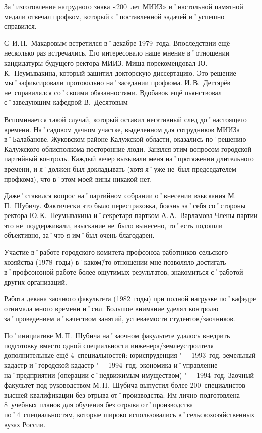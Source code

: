 За˚изготовление нагрудного знака «200~лет МИИЗ» и˚настольной памятной медали отвечал профком, который с˚поставленной задачей и˚успешно справился.

С~И.\,П.~Макаровым встретился в˚декабре 1979~года. Впоследствии ещё несколько раз встречались. Его интересовало наше мнение в˚отношении кандидатуры будущего ректора МИИЗ. Миша порекомендовал Ю.\,К.~Неумывакина, который защитил докторскую диссертацию. Это решение мы˚зафиксировали протокольно на˚заседании профкома. И.\,В.~Дегтярёв не~справилялся со˚своими обязанностями. Вдобавок ещё пьянствовал с˚заведующим кафедрой В.~Десятовым

Вспоминается такой случай, который оставил негативный след до˚настоящего времени. На˚садовом дачном участке, выделенном для сотрудников МИИЗа в˚Балабанове, Жуковском районе Калужской области, оказались по˚решению Калужского облисполкома посторонние люди. Занялся этим вопросом городской партийный контроль. Каждый вечер вызывали меня на˚протяжении длительного времени, и я˚должен был докладывать (хотя я˚уже не~был председателем профкома), что в˚этом моей вины никакой нет.

Даже˚ставился вопрос на˚партийном собрании о˚внесении взыскания М.\,П.~Шубичу. Фактически это было перестраховка, боязнь за˚себя со˚стороны ректора Ю.\,К.~Неумывакина и˚секретаря партком А.\,А.~Варламова Члены партии это не~поддерживали, взыскание не~было вынесено, то˚есть подошли объективно, за˚что я им˚был очень благодарен.

Участие в˚работе городского комитета профсоюза работников сельского хозяйства (1978~годы) в˚каком\=/то отношении мне позволяло достигать в˚профсоюзной работе более ощутимых результатов, знакомиться с˚работой других организаций.

Работа декана заочного факультета (1982~годы) при полной нагрузке по˚кафедре отнимала много времени и˚сил. Большое внимание уделял контролю за˚проведением и˚качеством занятий, успеваемости студентов\-/заочников.

По˚инициативе М.\,П.~Шубича на˚заочном факультете удалось внедрить подготовку вместо одной специальности инженера\-/землеустроителя дополнительные ещё 4~специальностей: юриспруденция "--- 1993~год, земельный кадастр и˚городской кадастр "--- 1994~год, экономика и˚управление на˚предприятии (операции с˚недвижимым имуществом) "--- 1994~год. Заочный факультет под руководством М.\,П.~Шубича выпустил более 200~специалистов высшей квалификации без отрыва от˚производства. Им лично подготовлена 8~учебных планов для обучения без отрыва от˚производства по˚4~специальностям, которые широко использовались в˚сельскохозяйственных вузах России. 

